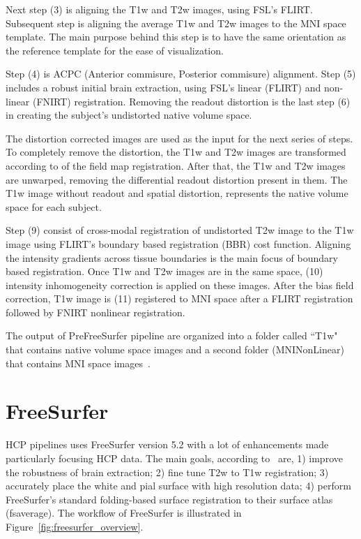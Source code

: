 Next step (3) is aligning the T1w and T2w images, using FSL's FLIRT. Subsequent step is aligning the average T1w and T2w images to the MNI space template. The main purpose behind this step is to have the same orientation as the reference template for the ease of visualization.

Step (4) is ACPC (Anterior commisure, Posterior commisure) alignment. Step (5) includes a robust initial brain extraction, using FSL's linear (FLIRT) and non-linear (FNIRT) registration. Removing the readout distortion is the last step (6) in creating the subject's undistorted native volume space. %

The distortion corrected images are used as the input for the next series of steps. To completely remove the distortion, the T1w and T2w images are transformed according to of the field map registration. After that, the T1w and T2w images are unwarped, removing the differential readout distortion present in them. The T1w image without readout and spatial distortion, represents the native volume space for each subject.

Step (9) consist of cross-modal registration of undistorted T2w image to the T1w image using FLIRT's boundary based registration (BBR) cost function. Aligning the intensity gradients across tissue boundaries is the main focus of boundary based registration. Once T1w and T2w images are in the same space, (10) intensity inhomogeneity correction is applied on these images. After the bias field correction, T1w image is (11) registered to MNI space after a FLIRT registration followed by FNIRT nonlinear registration.

The output of PreFreeSurfer pipeline are organized into a folder called ``T1w" that contains native volume space images and a second folder (MNINonLinear) that contains MNI space images~\cite{Gla13}.

\section{FreeSurfer} \label{sec:FreeSurfer}
HCP pipelines uses FreeSurfer version 5.2 with a lot of enhancements made particularly focusing HCP data. The main goals, according to~\cite{Gla13} are, 1) improve the robustness of brain extraction; 2) fine tune T2w to T1w registration; 3) accurately place the white and pial surface with high resolution data; 4) perform FreeSurfer's standard folding-based surface registration to their surface atlas (fsaverage). The workflow of FreeSurfer is illustrated in Figure~\ref{fig:freesurfer_overview}.

